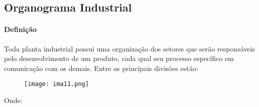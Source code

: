 \documentclass{article}
\begin{document}
        \subsection{Organograma Industrial}
            \paragraph{Definição}Toda planta industrial possui uma organização dos setores que serão responsáveis pelo desenvolvimento de um produto, cada qual seu processo específico em comunicação com os demais. Entre os principais divisões estão:
                \begin{figure}[H]
                    \centering
                    \texttt{[image: ima11.png]}
                \end{figure}\noindent
            Onde:
\end{document}
